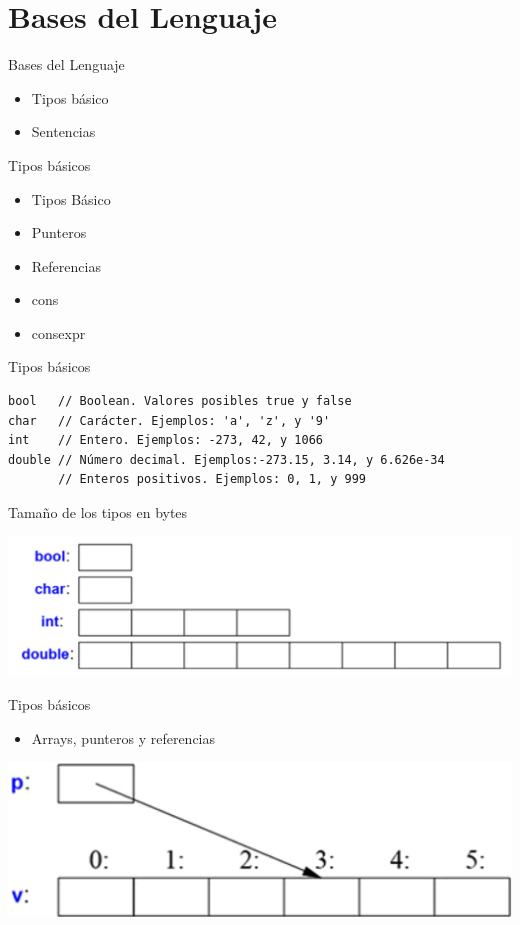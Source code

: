 \documentclass[aspectratio=169,presentation]{beamer}
\begin{document}
\section{Bases del Lenguaje}
\label{sec:org20d2171}
\begin{frame}[label={sec:org20faec7}]{Bases del Lenguaje}
\begin{itemize}
\item Tipos básico
\item Sentencias
\end{itemize}
\end{frame}
\begin{frame}[label={sec:orgd5c0b9c}]{Tipos básicos}
\begin{itemize}
\item Tipos Básico
\item Punteros
\item Referencias
\item cons
\item consexpr
\end{itemize}
\end{frame}
\begin{frame}[label={sec:orgf5cf01c},fragile]{Tipos básicos}
 \begin{verbatim}
bool   // Boolean. Valores posibles true y false
char   // Carácter. Ejemplos: 'a', 'z', y '9'
int    // Entero. Ejemplos: -273, 42, y 1066
double // Número decimal. Ejemplos:-273.15, 3.14, y 6.626e-34
       // Enteros positivos. Ejemplos: 0, 1, y 999
\end{verbatim}
\begin{block}{Tamaño de los tipos en bytes}
\begin{center}
\includegraphics[width=.9\linewidth]{./img/type-size.png}
\end{center}
\end{block}
\end{frame}
\begin{frame}[label={sec:org78e0362}]{Tipos básicos}
\begin{itemize}
\item Arrays, punteros y referencias
\end{itemize}
\begin{center}
\includegraphics[width=.9\linewidth]{./img/pointer-paint.png}
\end{center}
\end{frame}
\end{document}
